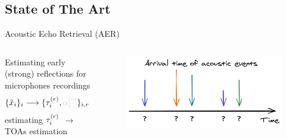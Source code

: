 \subsection*{State of The Art}

\begin{frame}[t]{Acoustic Echo Retrieval (AER) \hfill\faPalette}
    \begin{columns}[T,onlytextwidth]

            \vspace{.1em}
            Estimating early (strong) reflections for microphones recordings
            \begin{equation*}
                \{\contMic_i\}_i \longrightarrow \{ \tauir, \textcolor{black!20}{\ampir} \}_{i,r}
            \end{equation*}
            {\small estimating $\tau_i^{(r)}$ $\to$ TOAs estimation}

            \begin{figure}
                \centering
                \includegraphics[width=\textwidth]{./figures/arrivals.png}
            \end{figure}

    \end{columns}


\end{frame}
